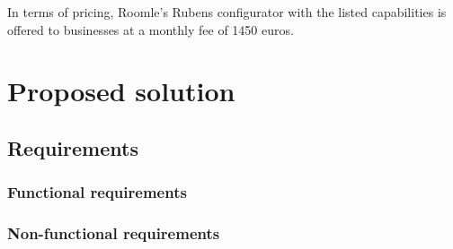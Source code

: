 In terms of pricing, Roomle's Rubens configurator with the listed capabilities is offered to businesses at a monthly fee of 1450 euros. \cite{RoomleFullLogic}

\section{Proposed solution}

\subsection{Requirements}

\subsubsection{Functional requirements}
\subsubsection{Non-functional requirements}